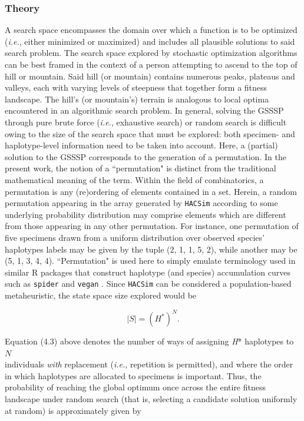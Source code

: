 \subsubsection{Theory}

A search space encompasses the domain over which a function is to be optimized \\ (\textit{i.e.}, either minimized or maximized) and includes all plausible solutions to said search problem. The search space explored by stochastic optimization algorithms can be best framed in the context of a person attempting to ascend to the top of hill or mountain. Said hill (or mountain) contains numerous peaks, plateaus and valleys, each with varying levels of steepness that together form a fitness landscape. The hill's (or mountain's) terrain is analogous to local optima encountered in an algorithmic search problem. In general, solving the GSSSP through pure brute force (\textit{i.e.}, exhaustive search) or random search is difficult owing to the size of the search space that must be explored: both specimen- and haplotype-level information need to be taken into account. Here, a (partial) solution to the GSSSP corresponds to the generation of a permutation. In the present work, the notion of a ``permutation" is distinct from the traditional mathematical meaning of the term. Within the field of combinatorics, a permutation is any (re)ordering of elements contained in a set. Herein, a random permutation appearing in the array generated by {\tt HACSim} according to some underlying probability distribution may comprise elements which are different from those appearing in any other permutation. For instance, one permutation of five specimens drawn from a uniform distribution over observed species' haplotypes labels may be given by the tuple (2, 1, 1, 5, 2), while another may be (5, 1, 3, 4, 4). ``Permutation" is used here to simply emulate terminology used in similar R packages that construct haplotype (and species) accumulation curves such as {\tt spider} \cite{brown2012spider} and {\tt vegan} \cite{dixon2003vegan}. Since {\tt HACSim} can be considered a population-based metaheuristic, the state space size explored would be \cite{chopard2018metaheuristics}

\begin{equation}
|S| = (H^*)^N.
\end{equation} 

\noindent Equation (4.3) above denotes the number of ways of assigning \textit{H}* haplotypes to $N$ \\ individuals \textit{with} replacement (\textit{i.e.}, repetition is permitted), and where the order in which haplotypes are allocated to specimens is important. Thus, the probability of reaching the global optimum once across the entire fitness landscape under random search (that is, selecting a candidate solution uniformly at random) is approximately given by

